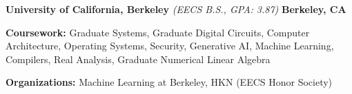 \textbf{University of California, Berkeley} \textit{(EECS B.S., GPA: 3.87)} \hfill \textbf{Berkeley, CA} \par
\textbf{Coursework:}
Graduate Systems,
Graduate Digital Circuits,
Computer Architecture,
Operating Systems,
Security,
Generative AI,
Machine Learning,
Compilers,
Real Analysis,
Graduate Numerical Linear Algebra
\par
\textbf{Organizations:} Machine Learning at Berkeley, HKN (EECS Honor Society)
\par